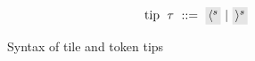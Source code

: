\begin{figure}
  \vspace{-3px}
  \[
  \arraycolsep=3pt\begin{array}{rlrl}
      \text{tip} & \tip & ::= & \lltip{s} ~\vert~ \rrtip{s}
  \end{array}\]

  \begin{mathpar}

  \end{mathpar}

  \caption{
    Syntax of tile and token tips
  }
  \label{fig:tip-syntax}
\end{figure}
